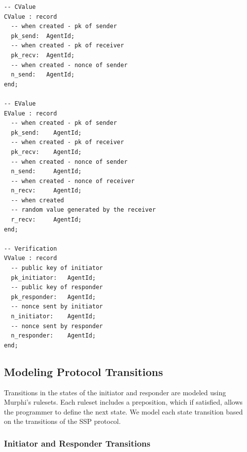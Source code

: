 \documentclass{acm_proc_article-sp}
\begin{document}
\begin{verbatim}
-- CValue
CValue : record
  -- when created - pk of sender
  pk_send:  AgentId;
  -- when created - pk of receiver
  pk_recv:  AgentId;
  -- when created - nonce of sender
  n_send:   AgentId;
end;

-- EValue
EValue : record
  -- when created - pk of sender
  pk_send:    AgentId;
  -- when created - pk of receiver
  pk_recv:    AgentId;
  -- when created - nonce of sender
  n_send:     AgentId;
  -- when created - nonce of receiver
  n_recv:     AgentId;
  -- when created
  -- random value generated by the receiver
  r_recv:     AgentId;
end;

-- Verification
VValue : record
  -- public key of initiator
  pk_initiator:   AgentId;
  -- public key of responder
  pk_responder:   AgentId;
  -- nonce sent by initiator
  n_initiator:    AgentId;
  -- nonce sent by responder
  n_responder:    AgentId;
end;
\end{verbatim}

\subsection{Modeling Protocol Transitions}
Transitions in the states of the initiator and responder are modeled using Murphi's rulesets. Each ruleset includes a preposition, which if satisfied, allows the programmer to define the next state. We model each state transition based on the transitions of the SSP protocol.

\subsubsection{Initiator and Responder Transitions}
\end{document}
